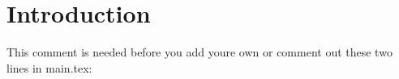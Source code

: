 \section{Introduction}\label{section:intro}
This comment is needed before you add youre own or comment out these two lines in main.tex:
 \cite{test}